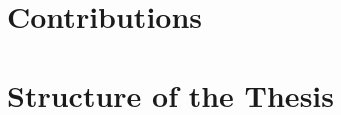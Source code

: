 %

\section{Contributions}
\label{sec:intro-contributions}


\section{Structure of the Thesis}
\label{sec:intro-structure}

